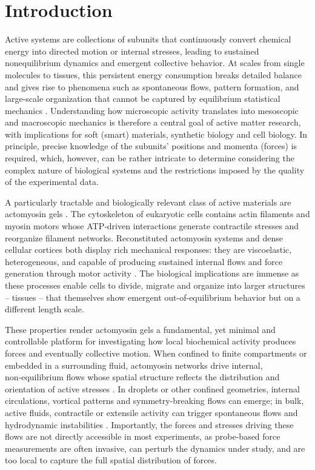 \documentclass[final,leqno]{scrarticle}
\begin{document}
\section{Introduction}

Active systems are collections of subunits that continuously convert chemical energy into directed motion or internal stresses, leading to sustained nonequilibrium dynamics and emergent collective behavior. At scales from single molecules to tissues, this persistent energy consumption breaks detailed balance and gives rise to phenomena such as spontaneous flows, pattern formation, and large‑scale organization that cannot be captured by equilibrium statistical mechanics \cite{Ramaswamy2010, Marchetti2013, Bechinger2016, Gompper2020, teVrugt2025}. Understanding how microscopic activity translates into mesoscopic and macroscopic mechanics is therefore a central goal of active matter research, with implications for soft (smart) materials, synthetic biology and cell biology. In principle, precise knowledge of the subunits' positions and momenta (forces) is required, which, however, can be rather intricate to determine considering the complex nature of biological systems and the restrictions imposed by the quality of the experimental data.

A particularly tractable and biologically relevant class of active materials are actomyosin gels \cite{JULICHER2007, Prost2015, Burla2019}. The cytoskeleton of eukaryotic cells contains actin filaments and myosin motors whose ATP‑driven interactions generate contractile stresses and reorganize filament networks. Reconstituted actomyosin systems and dense cellular cortices both display rich mechanical responses: they are viscoelastic, heterogeneous, and capable of producing sustained internal flows and force generation through motor activity \cite{AbuShah2014, Litschel2021, Liebe2023, Sakamoto2024, Sciortino2025, wollrab16}. The biological implications are immense as these processes enable cells to divide, migrate and organize into larger structures -- tissues -- that themselves show emergent out-of-equilibrium behavior but on a different length scale.  

These properties render actomyosin gels a fundamental, yet minimal and controllable platform for investigating how local biochemical activity produces forces and eventually collective motion.
When confined to finite compartments or embedded in a surrounding fluid, actomyosin networks drive internal, non‑equilibrium flows whose spatial structure reflects the distribution and orientation of active stresses \cite{Liebe2023, Litschel2021, Sciortino2025, Tsai2011}. In droplets or other confined geometries, internal circulations, vortical patterns and symmetry‑breaking flows can emerge; in bulk, active fluids, contractile or extensile activity can trigger spontaneous flows and hydrodynamic instabilities \cite{Bashirzadeh2021, Livne2024}. Importantly, the forces and stresses driving these flows are not directly accessible in most experiments, as probe‑based force measurements are often invasive, can perturb the dynamics under study, and are too local to capture the full spatial distribution of forces.
\end{document}
